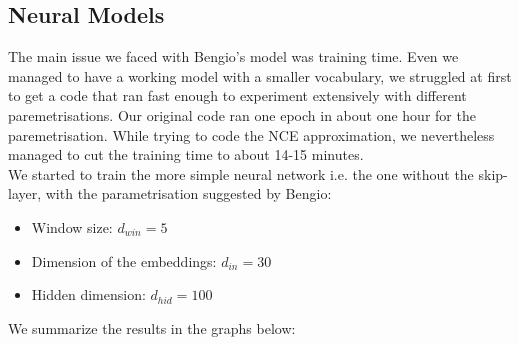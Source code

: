\documentclass[11pt]{article}
\begin{document}
\subsection{Neural Models}

The main issue we faced with Bengio's model was training time. Even we managed to have a working model with a smaller vocabulary, we struggled at first to get a code that ran fast enough to experiment extensively with different paremetrisations. Our original code ran one epoch in about one hour for the paremetrisation. While trying to code the NCE approximation, we nevertheless managed to cut the training time to about 14-15 minutes.\\

We started to train the more simple neural network i.e. the one without the skip-layer, with the parametrisation suggested by Bengio:

\begin{itemize}
\item Window size: $d_{win} = 5$
\item Dimension of the embeddings: $d_{in} = 30$
\item Hidden dimension: $d_{hid} = 100$
\end{itemize}

We summarize the results in the graphs below:
\end{document}
